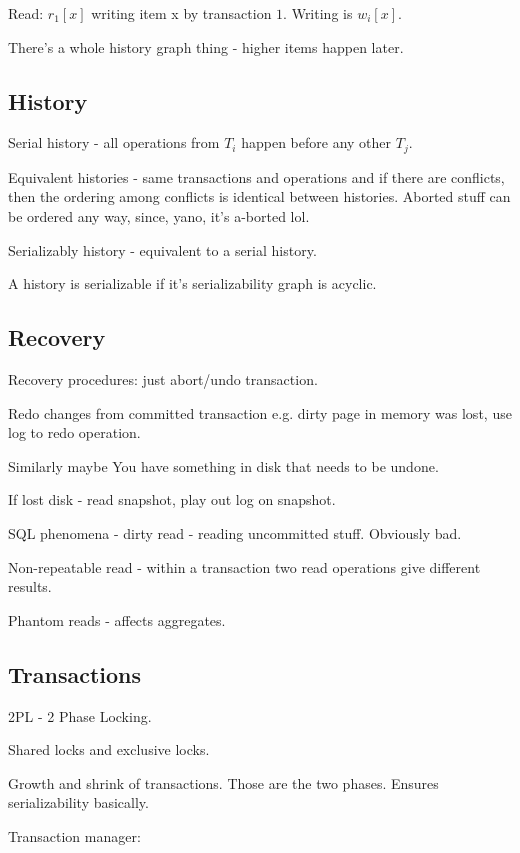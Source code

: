 \documentclass{article}
\begin{document}
		Read: $r_1[x]$ writing item x by transaction $1$. Writing is $w_i[x]$.
		
		There's a whole history graph thing - higher items happen later.
		
	\subsection{History}
	
		Serial history - all operations from $T_i$ happen before any other $T_j$.
		
		Equivalent histories - same transactions and operations and if there are conflicts, then the ordering among conflicts is identical between histories. Aborted stuff can be ordered any way, since, yano, it's a-borted lol.
		
		Serializably history - equivalent to a serial history.
		
		A history is serializable if it's serializability graph is acyclic.
		
	\subsection{Recovery}
	
		Recovery procedures: just abort/undo transaction.
		
		Redo changes from committed transaction e.g. dirty page in memory was lost, use log to redo operation.
		
		Similarly maybe You have something in disk that needs to be undone.
		
		If lost disk - read snapshot, play out log on snapshot.
		
		SQL phenomena - dirty read - reading uncommitted stuff. Obviously bad.
		
		Non-repeatable read - within a transaction two read operations give different results.
		
		Phantom reads - affects aggregates. 
		
	\subsection{Transactions}
	
		2PL - 2 Phase Locking.
		
		Shared locks and exclusive locks.
		
		Growth and shrink of transactions. Those are the two phases. Ensures serializability basically.
		
		Transaction manager:
		
\end{document}
